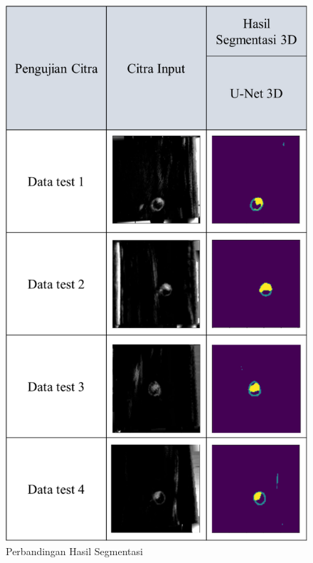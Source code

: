 \begin{figure}[h]
	\centering
	\includegraphics[scale= 0.2]{bab4/segmentasi 3D/predict_segmentasi3d.png}
	\caption{Perbandingan Hasil Segmentasi}
	\label{fig:result-label-tabel-segmentasi3d}
\end{figure}




